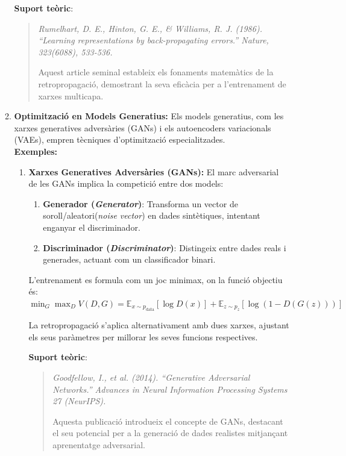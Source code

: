 \begin{enumerate}
\begin{enumerate}
 \textbf{Suport teòric}:
 \begin{quote}
 \textit{Rumelhart, D. E., Hinton, G. E., \& Williams, R. J. (1986). ``Learning representations by back-propagating errors.'' Nature, 323(6088), 533-536.}

 Aquest article seminal estableix els fonaments matemàtics de la retropropagació, demostrant la seva eficàcia per a l'entrenament de xarxes multicapa.
 \end{quote}

 \item \textbf{Optimització en Models Generatius:} Els models generatius, com les xarxes generatives adversàries (GANs) i els autoencoders variacionals (VAEs), empren tècniques d'optimització especialitzades.\\
 \textbf{Exemples:}\\
     \begin{enumerate}
      \item \textbf{Xarxes Generatives Adversàries (GANs):} El marc adversarial de les GANs implica la competició entre dos models:
          \begin{enumerate}
           \item \textbf{Generador (\textit{Generator})}: Transforma un vector de soroll/aleatori(\textit{noise vector}) en dades sintètiques, intentant enganyar el discriminador.

           \item \textbf{Discriminador (\textit{Discriminator})}: Distingeix entre dades reals i generades, actuant com un classificador binari.
          \end{enumerate}
           L'entrenament es formula com un joc minimax, on la funció objectiu és:
           $ \min_G \max_D V(D, G) = \mathbb{E}_{x \sim p_{\text{data}}}[\log D(x)] + \mathbb{E}_{z \sim p_z}[\log(1 - D(G(z)))] $

           La retropropagació s'aplica alternativament amb dues xarxes, ajustant els seus paràmetres per millorar les seves funcions respectives.

           \textbf{Suport teòric}:
           \begin{quote}
           \textit{Goodfellow, I., et al. (2014). ``Generative Adversarial Networks.'' Advances in Neural Information Processing Systems 27 (NeurIPS).}

           Aquesta publicació introdueix el concepte de GANs, destacant el seu potencial per a la generació de dades realistes mitjançant aprenentatge adversarial.
           \end{quote}


\end{enumerate}
\end{enumerate}
\end{enumerate}
